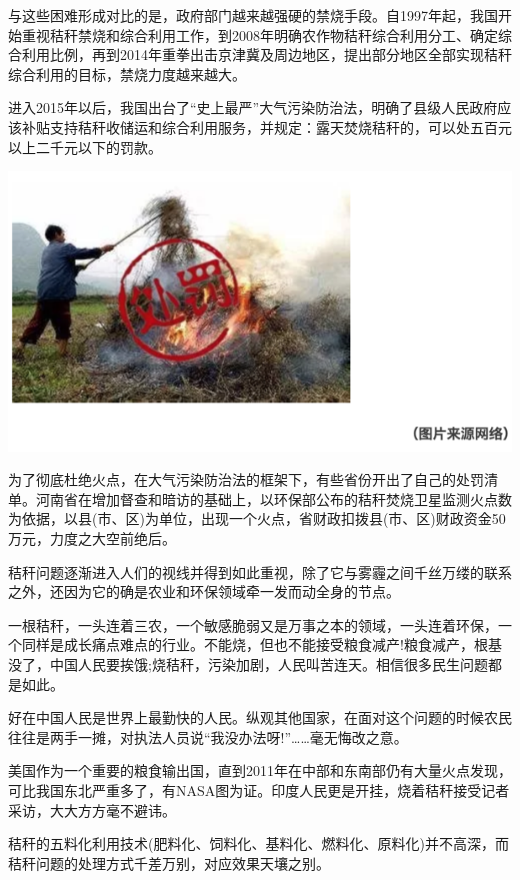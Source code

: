 \documentclass[
]{book}
\begin{document}
与这些困难形成对比的是，政府部门越来越强硬的禁烧手段。自1997年起，我国开始重视秸秆禁烧和综合利用工作，到2008年明确农作物秸秆综合利用分工、确定综合利用比例，再到2014年重拳出击京津冀及周边地区，提出部分地区全部实现秸秆综合利用的目标，禁烧力度越来越大。

进入2015年以后，我国出台了``史上最严''大气污染防治法，明确了县级人民政府应该补贴支持秸秆收储运和综合利用服务，并规定：露天焚烧秸秆的，可以处五百元以上二千元以下的罚款。

\includegraphics[width=8.33in]{images/stalk3}

为了彻底杜绝火点，在大气污染防治法的框架下，有些省份开出了自己的处罚清单。河南省在增加督查和暗访的基础上，以环保部公布的秸秆焚烧卫星监测火点数为依据，以县(市、区)为单位，出现一个火点，省财政扣拨县(市、区)财政资金50万元，力度之大空前绝后。

秸秆问题逐渐进入人们的视线并得到如此重视，除了它与雾霾之间千丝万缕的联系之外，还因为它的确是农业和环保领域牵一发而动全身的节点。

一根秸秆，一头连着三农，一个敏感脆弱又是万事之本的领域，一头连着环保，一个同样是成长痛点难点的行业。不能烧，但也不能接受粮食减产!粮食减产，根基没了，中国人民要挨饿;烧秸秆，污染加剧，人民叫苦连天。相信很多民生问题都是如此。

好在中国人民是世界上最勤快的人民。纵观其他国家，在面对这个问题的时候农民往往是两手一摊，对执法人员说``我没办法呀!''\ldots\ldots 毫无悔改之意。

美国作为一个重要的粮食输出国，直到2011年在中部和东南部仍有大量火点发现，可比我国东北严重多了，有NASA图为证。印度人民更是开挂，烧着秸秆接受记者采访，大大方方毫不避讳。

秸秆的五料化利用技术(肥料化、饲料化、基料化、燃料化、原料化)并不高深，而秸秆问题的处理方式千差万别，对应效果天壤之别。
\end{document}
